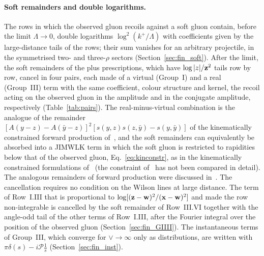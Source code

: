 \paragraph{Soft remainders and double logarithms.} The rows in which the observed gluon recoils against a soft gluon contain, before the limit $\Lambda\to0$, double logarithms $\log^2(k^+/\Lambda)$ with coefficients given by the large-distance tails of the rows; their sum vanishes for an arbitrary projectile, in the symmetrised two- and three-$\rho$ sectors (Section~\ref{sec:fin_soft}). After the limit, the soft remainders of the plus prescriptions, which have $\log|z|/\mathbf{z}^2$ tails row by row, cancel in four pairs, each made of a virtual (Group~I) and a real (Group~III) term with the same coefficient, colour structure and kernel, the recoil acting on the observed gluon in the amplitude and in the conjugate amplitude, respectively (Table~\ref{tab:pairs}). The real-minus-virtual combination is the analogue of the remainder $[A(y-z)-A(\bar y-z)]^2[s(y,z)s(z,\bar y)-s(y,\bar y)]$ of the kinematically constrained forward production of~\cite{Altinoluk:2014eka}, and the soft remainders can equivalently be absorbed into a JIMWLK term in which the soft gluon is restricted to rapidities below that of the observed gluon, Eq.~\eqref{eq:kinconstr}, as in the kinematically constrained formulations of~\cite{Altinoluk:2014eka,Ducloue:2016shw} (the constraint of~\cite{Ducloue:2016shw} has not been compared in detail). The analogous remainders of forward production were discussed in~\cite{Stasto:2013cha,Altinoluk:2014eka,Ducloue:2016shw}. The cancellation requires no condition on the Wilson lines at large distance. The term of Row~I.III that is proportional to $\log[(\mathbf{z}-\mathbf{w})^2/(\mathbf{x}-\mathbf{w})^2]$ and made the row non-integrable is cancelled by the soft remainder of Row~III.VI together with the angle-odd tail of the other terms of Row~I.III, after the Fourier integral over the position of the observed gluon (Section~\ref{sec:fin_GIIII}). The instantaneous terms of Group~III, which converge for $\vee\to\infty$ only as distributions, are written with $\pi\delta(s)-i\mathcal P\frac1s$ (Section~\ref{sec:fin_inst}).

